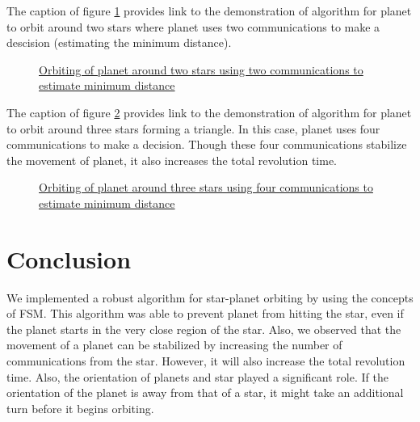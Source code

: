 \documentclass{report}[12pt]
\begin{document}
The caption of figure \ref{fig:orbit_two_star} provides link to the demonstration of algorithm for planet to orbit around two stars where planet uses two communications to make a descision (estimating the minimum distance).
\begin{figure}[H]
	\centering
	\caption{\href{https://youtu.be/EKvty2OxXxM}{Orbiting of planet around two stars using two communications to estimate minimum distance}}
	\label{fig:orbit_two_star}
\end{figure}

The caption of figure \ref{fig:orbit_three_stars} provides link to the demonstration of algorithm for planet to orbit around three stars forming a triangle. In this case, planet uses four communications to make a decision. Though these four communications stabilize the movement of planet, it also increases  the total revolution time. 
\begin{figure}[H]
	\centering
	\caption{\href{https://youtu.be/5aZm0Os9BPc}{Orbiting of planet around three stars using four communications to estimate minimum distance}}
	\label{fig:orbit_three_stars}
\end{figure}

\section{Conclusion}
We implemented a robust algorithm for star-planet orbiting by using the concepts of FSM. This algorithm was able to prevent planet from hitting the star, even if the planet starts in the very close region of the star. Also, we observed that the movement of a planet can be stabilized by increasing the number of communications from the star. However, it will also increase the total revolution time. Also, the orientation of planets and star played a significant role. If the orientation of the planet is away from that of a star, it might take an additional turn before it begins orbiting.  
\end{document}
